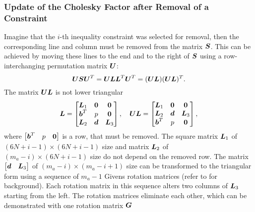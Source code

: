 \subsubsection{Update of the Cholesky Factor after Removal of a Constraint}\label{sec.del_ic}
Imagine that the $i$-th inequality constraint was selected for removal, then the 
corresponding line and column must be removed from the matrix $\mbox{\boldmath $S$}$. This can be
achieved by moving these lines to the end and to the right of $\mbox{\boldmath $S$}$ using 
a row-interchanging permutation matrix $\mbox{\boldmath $U$}$:
$$
\mbox{\boldmath $U$} \mbox{\boldmath $S$} \mbox{\boldmath $U$}^T = 
\mbox{\boldmath $U$} \mbox{\boldmath $L$} \mbox{\boldmath $L$}^T \mbox{\boldmath $U$}^T = 
(\mbox{\boldmath $U$} \mbox{\boldmath $L$}) (\mbox{\boldmath $U$} \mbox{\boldmath $L$})^T.
$$
The matrix $\mbox{\boldmath $U$}\mbox{\boldmath $L$}$ is not lower triangular
$$
\mbox{\boldmath $L$} = 
\begin{bmatrix}
    \mbox{\boldmath $L$}_1 & \mbox{\boldmath $0$}     & \mbox{\boldmath $0$}\\
    \mbox{\boldmath $b$}^T & p           & \mbox{\boldmath $0$}\\
    \mbox{\boldmath $L$}_2 & \mbox{\boldmath $d$}     & \mbox{\boldmath $L$}_3\\
\end{bmatrix}, \quad
\mbox{\boldmath $U$}\mbox{\boldmath $L$} = 
\begin{bmatrix}
    \mbox{\boldmath $L$}_1 & \mbox{\boldmath $0$}     & \mbox{\boldmath $0$}\\
    \mbox{\boldmath $L$}_2 & \mbox{\boldmath $d$}     & \mbox{\boldmath $L$}_3\\
    \mbox{\boldmath $b$}^T & p           & \mbox{\boldmath $0$}\\
\end{bmatrix},
$$
where $\begin{bmatrix} \mbox{\boldmath $b$}^T & p & \mbox{\boldmath $0$} \end{bmatrix}$ is a row, 
that must be removed. The square matrix $\mbox{\boldmath $L$}_1$ of $(6N + i-1)\times(6N + i-1)$ 
size and matrix $\mbox{\boldmath $L$}_2$ of $(m_a - i)\times(6N + i-1)$ size do not depend on 
the removed row. The matrix $\begin{bmatrix} \mbox{\boldmath $d$} & \mbox{\boldmath $L$}_3 \end{bmatrix}$ 
of $(m_a - i)\times(m_a - i + 1)$ size can be transformed to the triangular form using 
a sequence of $m_a-1$ Givens rotation matrices (refer to \cite{golub1996matrix} for 
background). Each rotation matrix in this sequence alters two columns of $\mbox{\boldmath $L$}_3$ 
starting from the left. The rotation matrices eliminate each other, which can be 
demonstrated with one rotation matrix $\mbox{\boldmath $G$}$
